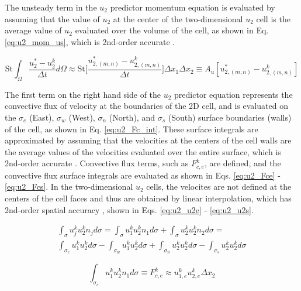 \documentclass[10pt, letterpaper]{article}
\begin{document}
The unsteady term in the $u_{2}$ predictor momentum equation is evaluated by assuming that the value of $u_{2}$ at the center of the two-dimensional $u_{2}$ cell is the average value of $u_{2}$ evaluated over the volume of the cell, as shown in Eq. \ref{eq:u2_mom_us}, which is 2nd-order accurate \cite{Ferziger_Springer_2002}.

\begin{equation}
  \text{St}\int_{\Omega}\frac{u_{2}^{*}-u_{2}^{k}}{\Delta{t}}d\Omega \approx
  \text{St}\bigg[\frac{u_{2,(m,n)}^{*}-u_{2,(m,n)}^{k}}{\Delta{t}}\bigg]\Delta{x_{1}}\Delta{x_{2}} \equiv
  A_{u}[u_{2,(m,n)}^{*} - u_{2,(m,n)}^{k}]
  \label{eq:u2_mom_us}  
\end{equation}

The first term on the right hand side of the $u_{2}$ predictor equation represents the convective flux of velocity at the boundaries of the 2D cell, and is evaluated on the $\sigma_{e}$ (East), $\sigma_{w}$ (West), $\sigma_{n}$ (North), and $\sigma_{s}$ (South) surface boundaries (walls) of the cell, as shown in Eq. \ref{eq:u2_Fc_int}. These surface integrals are approximated by assuming that the velocities at the centers of the cell walls are the average values of the velocities evaluated over the entire surface, which is 2nd-order accurate \cite{Ferziger_Springer_2002}. Convective flux terms, such as $F_{c,e}^{k}$, are defined, and the convective flux surface integrals are evaluated as shown in Eqs. \ref{eq:u2_Fce} - \ref{eq:u2_Fcs}. In the two-dimensional $u_{2}$ cells, the velocites are not defined at the centers of the cell faces and thus are obtained by linear interpolation, which has 2nd-order spatial accuracy \cite{Ferziger_Springer_2002}, shown in Eqs. \ref{eq:u2_u2e} - \ref{eq:u2_u2s}. 

\begin{multline}
  \int_{\sigma}u_{j}^{k}u_{2}^{k}n_{j}d\sigma = 
  \int_{\sigma}u_{1}^{k}u_{2}^{k}n_{1}d\sigma + \int_{\sigma}u_{2}^{k}u_{2}^{k}n_{2}d\sigma = \\
  \int_{\sigma_{e}}u_{1}^{k}u_{2}^{k}d\sigma - \int_{\sigma_{w}}u_{1}^{k}u_{2}^{k}d\sigma + \int_{\sigma_{n}}u_{2}^{k}u_{2}^{k}d\sigma - \int_{\sigma_{s}}u_{2}^{k}u_{2}^{k}d\sigma
  \label{eq:u2_Fc_int}
\end{multline}

\begin{equation}
  \int_{\sigma_{e}}u_{1}^{k}u_{2}^{k}n_{1}d\sigma \equiv
  F_{c,e}^{k} \approx u_{1,e}^{k}u_{2,e}^{k}\Delta{x_{2}}
  \label{eq:u2_Fce}
\end{equation}
\end{document}
